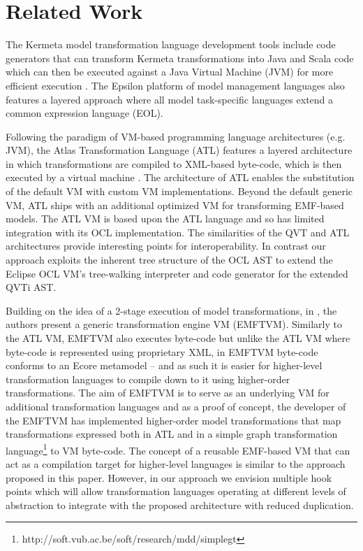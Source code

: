 \section{Related Work}\label{sec:related}

The Kermeta model transformation language development tools include code generators that can transform Kermeta transformations into Java and Scala code which can then be executed against a Java Virtual Machine (JVM) for more efficient execution \cite{Fouquet.etal2010}. The Epsilon\cite{Paige.etal2009} platform of model management languages also features a layered approach where all model task-specific languages extend a common expression language (EOL).

Following the paradigm of VM-based programming language architectures (e.g. JVM), the Atlas Transformation Language (ATL) features a layered architecture in which transformations are compiled to XML-based byte-code, which is then executed by a virtual machine \cite{Jouault.etal2008}. The architecture of ATL enables the substitution of the default VM with custom VM implementations. Beyond the default generic VM, ATL ships with an additional optimized VM for transforming EMF-based models. The ATL VM is based upon the ATL language and so has limited integration with its OCL implementation. The similarities of the QVT and ATL architectures provide interesting points for interoperability\cite{Jouault.Kurtev2006}. In contrast our approach exploits the inherent tree structure of the OCL AST to extend the Eclipse OCL VM's tree-walking interpreter and code generator for the extended QVTi AST. 

Building on the idea of a 2-stage execution of model transformations, in \cite{Wagelaar.etal2011}, the authors present a generic transformation engine VM (EMFTVM). Similarly to the ATL VM, EMFTVM also executes byte-code but unlike the ATL VM where byte-code is represented using proprietary XML, in EMFTVM byte-code conforms to an Ecore metamodel -- and as such it is easier for higher-level transformation languages to compile down to it using higher-order transformations. The aim of EMFTVM is to serve as an underlying VM for additional transformation languages and as a proof of concept, the developer of the EMFTVM has implemented higher-order model transformations that map transformations expressed both in ATL and in a simple graph transformation language\footnote{http://soft.vub.ac.be/soft/research/mdd/simplegt} to VM byte-code. The concept of a reusable EMF-based VM that can act as a compilation target for higher-level languages is similar to the approach proposed in this paper. However, in our approach we envision multiple hook points which will allow transformation languages operating at different levels of abstraction to integrate with the proposed architecture with reduced duplication.

